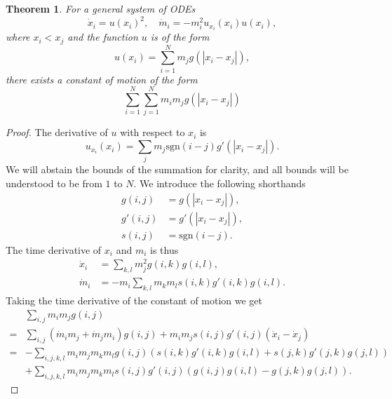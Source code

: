 \documentclass[english,master]{liumaiex}
\theoremstyle{plain}
\newtheorem{theorem}[proposition]{Theorem}
\theoremstyle{definition}
\newcommand{\sgn}{\text{sgn}}
\begin{document}
\begin{theorem}
	For a general system of ODEs
	\begin{equation}
		\dot{x}_i = u(x_i)^2,
		\quad
		\dot{m}_i = -m_i^2 u_{x_i}(x_i) u(x_i),
	\end{equation}
	where $x_i < x_j$ and the function $u$ is of the form
	\begin{equation}
		u(x_i) = \sum_{i=1}^{N} m_j g(|x_i - x_j|),
	\end{equation}
	there exists a constant of motion of the form
	\begin{equation}
		\sum_{i=1}^{N}\sum_{j=1}^N m_i m_j g(|x_i - x_j|)
	\end{equation}
\end{theorem}
\begin{proof}
	The derivative of $u$ with respect to $x_i$ is
	\begin{equation}
		u_{x_i}(x_i) = \sum_j m_j \sgn(i - j) g'(|x_i - x_j|).
	\end{equation}
	We will abstain the bounds of the summation for clarity, and all bounds will be understood to be from $1$ to $N$. We introduce the following shorthands
	\begin{equation}
	\begin{aligned}
		g(i,j) &= g(|x_i - x_j|),\\
		g'(i,j) &= g'(|x_i - x_j|),\\
		s(i,j) &= \sgn(i - j).
	\end{aligned}
	\end{equation}
	The time derivative of $x_i$ and $m_i$ is thus
	\begin{equation}
	\begin{aligned}
		\dot{x}_i &= \sum_{k,l} m_j^2 g(i,k) g(i,l),\\
		\dot{m}_i &= -m_i \sum_{k,l} m_k m_l s(i,k) g'(i,k) g(i,l).
	\end{aligned}
	\end{equation}
	Taking the time derivative of the constant of motion we get
	\begin{equation}
	\begin{aligned}
		&\sum_{i,j} m_i m_j g(i,j) \\
		=& \sum_{i,j} (\dot{m}_i m_j + \dot{m}_j m_i) g(i,j) + m_i m_j s(i,j) g'(i,j) (\dot{x}_i - \dot{x}_j) \\
		=& - \sum_{i,j,k,l} m_i m_j m_k m_l g(i,j) (s(i,k) g'(i,k) g(i,l) + s(j,k) g'(j,k) g(j,l)) \\
		&+ \sum_{i,j,k,l} m_i m_j m_k m_l s(i,j) g'(i,j) (g(i,j) g(i,l) - g(j,k) g(j,l)).

\end{aligned}
\end{equation}
\end{proof}
\end{document}

